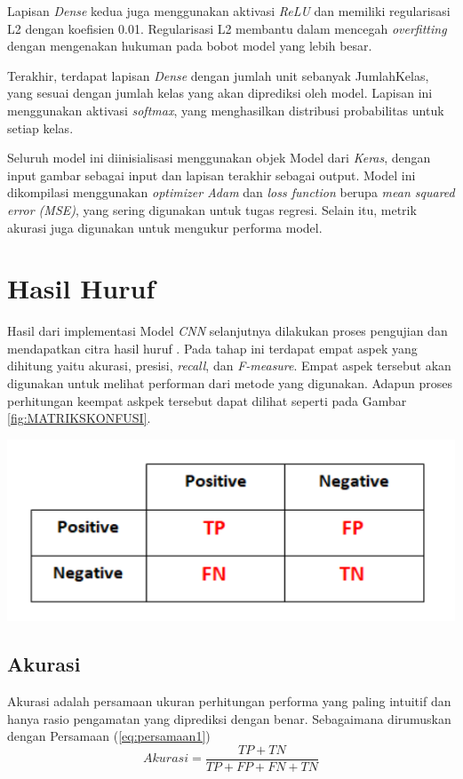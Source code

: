 Lapisan \textit{Dense} kedua juga menggunakan aktivasi \textit{ReLU} dan memiliki regularisasi L2 dengan koefisien 0.01. Regularisasi L2 membantu dalam mencegah \textit{overfitting} dengan mengenakan hukuman pada bobot model yang lebih besar.

Terakhir, terdapat lapisan \textit{Dense} dengan jumlah unit sebanyak JumlahKelas, yang sesuai dengan jumlah kelas yang akan diprediksi oleh model. Lapisan ini menggunakan aktivasi \textit{softmax}, yang menghasilkan distribusi probabilitas untuk setiap kelas.

Seluruh model ini diinisialisasi menggunakan objek Model dari \textit{Keras}, dengan input gambar sebagai input dan lapisan terakhir sebagai output. Model ini dikompilasi menggunakan \textit{optimizer Adam} dan \textit{loss function} berupa\textit{ mean squared error (MSE)}, yang sering digunakan untuk tugas regresi. Selain itu, metrik akurasi juga digunakan untuk mengukur performa model.

\section{Hasil Huruf}
Hasil dari implementasi Model \textit{CNN} selanjutnya dilakukan proses pengujian dan mendapatkan citra hasil huruf . Pada tahap ini terdapat empat aspek yang dihitung yaitu akurasi, presisi, \textit{recall}, dan \emph {F-measure}. Empat aspek tersebut akan digunakan untuk melihat performan dari metode yang digunakan. Adapun proses perhitungan keempat askpek tersebut dapat dilihat seperti pada Gambar \ref{fig:MATRIKSKONFUSI}.
\begin{center}
	\includegraphics[width=1.0\linewidth]{gambar/bener/Nilai-Konfusi-Matriks.png}
	\label{fig:MATRIKSKONFUSI}
\end{center}

\subsection{Akurasi}
Akurasi adalah persamaan ukuran perhitungan performa yang paling intuitif dan hanya rasio pengamatan yang diprediksi dengan benar. Sebagaimana dirumuskan dengan Persamaan (\ref{eq:persamaan1})
\begin{equation}\label{eq:persamaan1}
Akurasi=\frac{TP+TN}{TP+FP+FN+TN}
\end{equation}
